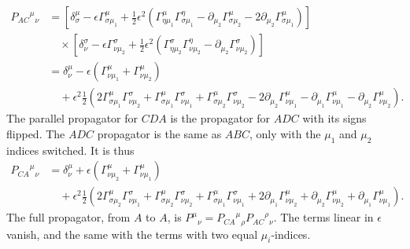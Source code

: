 %
\begin{align}
    \nonumber
    {P_{AC}}^\mu{}_{\nu}
    & = 
    \left[ 
        \delta^\mu_\sigma 
        -\epsilon \Gamma^{\mu}_{\sigma \mu_1}
        + \frac{1}{2} \epsilon^2 
        \left(
        \Gamma^\mu_{\eta \mu_1}\Gamma^\eta_{\sigma \mu_1}
        - \partial_{\mu_2} \Gamma^{\mu}_{\sigma \mu_2}
        - 2 \partial_{\mu_2} \Gamma^{\mu}_{\sigma \mu_1}
        \right)
    \right]\\\nonumber
    &\quad\times
    \left[
        \delta^\sigma_\nu
        - \epsilon \Gamma^{\sigma}_{\nu \mu_2}
        + \frac{1}{2} \epsilon^2 
        \left(
            \Gamma^\sigma_{\eta \mu_2}\Gamma^\eta_{\nu \mu_2}
            - \partial_{\mu_2} \Gamma^{\sigma}_{\nu \mu_2}
        \right)
    \right] \\ \nonumber
    & =
    \delta^\mu_\nu
    - \epsilon 
    \left(
        \Gamma^{\mu}_{\nu \mu_1}
        +
        \Gamma^{\mu}_{\nu \mu_2}
    \right)\\
    &\quad
    + \epsilon^2
    \frac{1}{2}
    \left(  
        2\Gamma^{\mu}_{\sigma \mu_1} \Gamma^{\sigma}_{\nu \mu_2}
        + \Gamma^\mu_{\sigma \mu_1}\Gamma^\sigma_{\nu \mu_1}
        + \Gamma^\mu_{\sigma \mu_2}\Gamma^\sigma_{\nu \mu_2}
        - 2 \partial_{\mu_2} \Gamma^{\mu}_{\nu \mu_1}
        - \partial_{\mu_1} \Gamma^{\mu}_{\nu \mu_1}
        - \partial_{\mu_2} \Gamma^{\mu}_{\nu \mu_2}
    \right).
\end{align}
%
The parallel propagator for $CDA$ is the propagator for $ADC$ with its signs flipped. 
The $ADC$ propagator is the same as $ABC$, only with the $\mu_1$ and $\mu_2$ indices switched.
It is thus
%
\begin{align}
    \nonumber
    {P_{CA}}^\mu{}_\nu
    & =
    \delta^\mu_\nu
    + \epsilon 
    \left(
        \Gamma^{\mu}_{\nu \mu_2}
        +
        \Gamma^{\mu}_{\nu \mu_1}
    \right)\\
    &\quad
    + \epsilon^2
    \frac{1}{2}
    \left(  
        2\Gamma^{\mu}_{\sigma \mu_2} \Gamma^{\sigma}_{\nu \mu_1}
        + \Gamma^\mu_{\sigma \mu_2}\Gamma^\sigma_{\nu \mu_2}
        + \Gamma^\mu_{\sigma \mu_1}\Gamma^\sigma_{\nu \mu_1}
        + 2 \partial_{\mu_1} \Gamma^{\mu}_{\nu \mu_2}
        + \partial_{\mu_2} \Gamma^{\mu}_{\nu \mu_2}
        + \partial_{\mu_1} \Gamma^{\mu}_{\nu \mu_1}
    \right).
\end{align}
%
The full propagator, from $A$ to $A$, is $P^\mu{}_\nu = {P_{CA}}^\mu{}_\rho {P_{AC}}^\rho{}_\nu$.
The terms linear in $\epsilon$ vanish, and the same with the terms with two equal $\mu_i$-indices.
